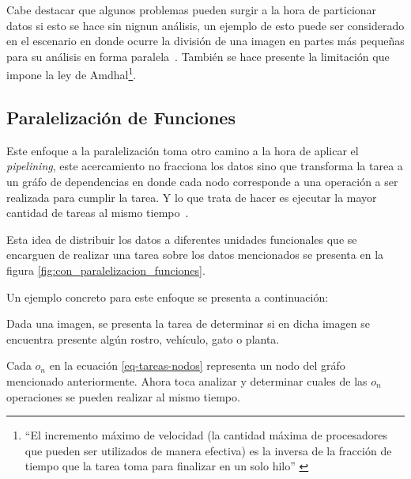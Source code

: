 Cabe destacar que algunos problemas pueden surgir a la hora de particionar
datos si esto se hace sin nignun análisis, un ejemplo de esto puede ser
considerado en el escenario en donde ocurre
la división de una imagen en partes más pequeñas para su análisis en forma
paralela~\cite{oshitani1999}. También se hace presente la limitación que impone
la ley de Amdhal\footnote{``El incremento máximo de velocidad (la cantidad máxima de
procesadores que pueden ser utilizados de manera efectiva) es la inversa de la
fracción de tiempo que la tarea toma para finalizar en un solo
hilo'' \cite{rodgers1985}}.
% 

\subsection{Paralelización de Funciones}
\label{ssec:paralelizacion_de_funciones}

\begin{tcolorbox}
  Este enfoque a la paralelización toma otro camino a la hora de aplicar el
  \textit{pipelining}, este acercamiento
  no fracciona los datos sino que transforma la tarea a un gráfo de 
  dependencias en donde cada nodo corresponde a una operación a ser realizada
  para cumplir la tarea. Y lo que trata de hacer es ejecutar la mayor
  cantidad de tareas al mismo tiempo~\cites{meng2013, liu2019, zhou2020,
  lin2021}.
\end{tcolorbox}

Esta idea de distribuir los datos a diferentes unidades funcionales que se
encarguen de realizar una tarea sobre los datos mencionados se presenta en la
figura \ref{fig:con_paralelizacion_funciones}.



Un ejemplo concreto para este enfoque se presenta a continuación:

\begin{tcolorbox}
  Dada una imagen, se presenta la tarea de determinar si en dicha imagen se
  encuentra presente algún rostro, vehículo, gato o planta.
\end{tcolorbox}


\vspace{1cm}

Cada $o_{n}$ en la ecuación \ref{eq-tareas-nodos} representa un nodo del gráfo 
mencionado anteriormente. Ahora toca analizar y determinar
cuales de las $o_{n}$ operaciones se pueden realizar al mismo tiempo.

